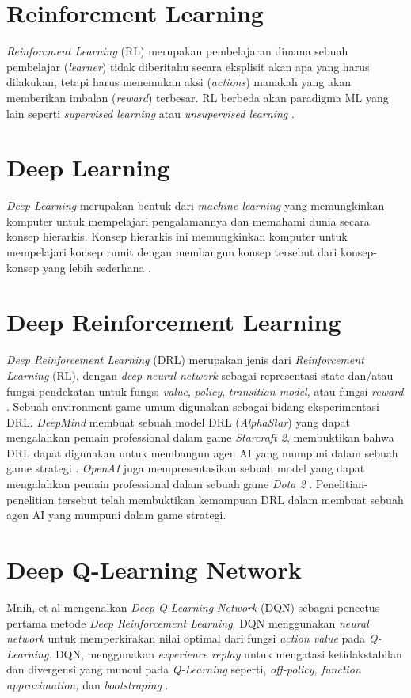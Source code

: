 \section{Reinforcment Learning}
\emph{Reinforcment Learning} (RL) merupakan pembelajaran dimana sebuah pembelajar (\emph{learner}) tidak diberitahu
secara eksplisit akan apa yang harus dilakukan, tetapi harus menemukan aksi (\emph{actions}) 
manakah yang akan memberikan imbalan (\emph{reward}) terbesar. 
RL berbeda akan paradigma ML yang lain seperti \emph{supervised learning} atau \emph{unsupervised learning} \citep{reinforcmentL}. 

\section{Deep Learning}
\emph{Deep Learning} merupakan bentuk dari \emph{machine learning} yang memungkinkan komputer untuk mempelajari pengalamannya dan memahami dunia secara konsep hierarkis. 
Konsep hierarkis ini memungkinkan komputer untuk mempelajari konsep rumit dengan membangun konsep tersebut dari konsep-konsep yang lebih sederhana \citep{deepL}.

\section{Deep Reinforcement Learning}
\emph{Deep Reinforcement Learning} (DRL) merupakan jenis dari \emph{Reinforcement Learning} (RL), dengan \emph{deep neural network} sebagai representasi state
dan/atau fungsi pendekatan untuk fungsi \emph{value}, \emph{policy}, \emph{transition model}, atau fungsi \emph{reward} \citep{deepRL}.
Sebuah environment game umum digunakan sebagai bidang eksperimentasi DRL.
\emph{DeepMind} membuat sebuah model DRL (\emph{AlphaStar}) yang dapat mengalahkan pemain professional dalam game \emph{Starcraft 2}, membuktikan bahwa DRL dapat digunakan untuk membangun agen AI yang mumpuni dalam sebuah game strategi \citep{alphaStar}.
\emph{OpenAI} juga mempresentasikan sebuah model yang dapat mengalahkan pemain professional dalam sebuah game \emph{Dota 2} \citep{openaiDota2}.
Penelitian-penelitian tersebut telah membuktikan kemampuan DRL dalam membuat sebuah agen AI yang mumpuni dalam game strategi.

\section{Deep Q-Learning Network}
Mnih, et al mengenalkan \emph{Deep Q-Learning Network} (DQN)\citep{deepQN} sebagai pencetus pertama metode \emph{Deep Reinforcement Learning}. DQN menggunakan \emph{neural network} untuk memperkirakan nilai optimal dari fungsi \emph{action value} pada \emph{Q-Learning}.
DQN, menggunakan \emph{experience replay} untuk mengatasi ketidakstabilan dan divergensi yang muncul pada \emph{Q-Learning} seperti, \emph{off-policy, function approximation,} dan \emph{bootstraping} \citep{deepQNFunction}.


